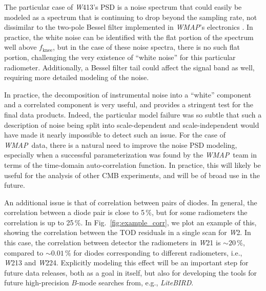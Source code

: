 \documentclass[twocolumn]{../../common/aa}
\def\WMAP{\emph{WMAP}}
\newcommand{\W}[0]{\textit W}
\begin{document}

The particular case of \W413's PSD is a noise spectrum that could easily be modeled as a spectrum that is continuing to drop beyond the sampling rate, not dissimilar to the two-pole Bessel filter implemented in \WMAP's electronics \citep{jarosik2003:MAP}. In practice, the white noise can be identified with the flat portion of the spectrum well above $f_\mathrm{knee}$, but in the case of these noise spectra, there is no such flat portion, challenging the very existence of ``white noise'' for this particular radiometer. Additionally, a Bessel filter tail could affect the signal band as well, requiring more detailed modeling of the noise.

In practice, the decomposition of instrumental noise into a ``white'' component and a correlated component is very useful, and provides a stringent test for the final data products. Indeed, the particular model failure was so subtle that such a description of noise being split into scale-dependent and scale-independent would have made it nearly impossible to detect such an issue.
For the case of \WMAP\ data, there is a natural need to improve the noise PSD modeling, especially when a successful parameterization was found by the \WMAP\ team in terms of the time-domain auto-correlation function. In practice, this will likely be useful for the analysis of other CMB experiments, and will be of broad use in the future.

An additional issue is that of correlation between pairs of diodes. In general, the correlation between a diode pair is close to 5\,\%, but for some radiometers the correlation is up to 25\,\%. In Fig.~\ref{fig:example_corr}, we plot an example of this, showing the correlation between the TOD residuals in a single scan for \W2. In this case, the correlation between detector the radiometers in \W21 is ${\sim20\,\%}$, compared to $\sim0.01\,\%$ for diodes corresponding to different radiometers, i.e., \W213 and \W224. Explicitly modeling this effect will be an important step for future data releases, both as a goal in itself, but also for developing the tools for future high-precision $B$-mode searches from, e.g., \textit{LiteBIRD}.
\end{document}

